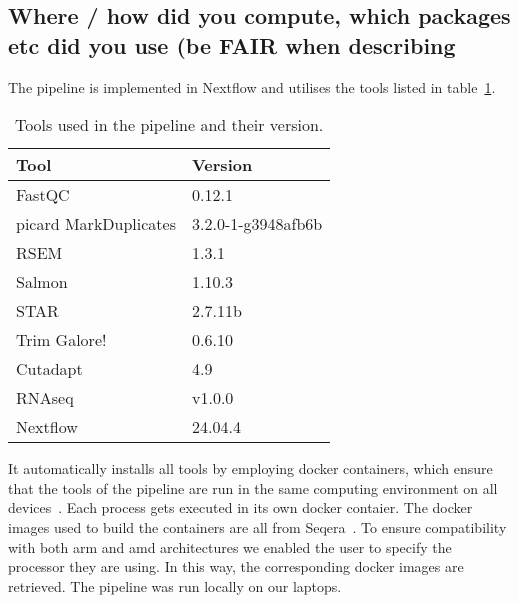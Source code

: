 \documentclass{article}
\theoremstyle{plain}
\theoremstyle{definition}
\theoremstyle{remark}
\begin{document}
\subsection{Where / how did you compute, which packages etc did you use (be FAIR when describing}
The pipeline is implemented in Nextflow and utilises the tools listed in table~\ref{table:1}.
\begin{table}[h]
    \centering
    \caption{Tools used in the pipeline and their version.}
    \label{table:1}
    \begin{tabular}{@{}lp{4cm}@{}}
        \toprule
        \textbf{Tool} & \textbf{Version} \\ \midrule
        FastQC & 0.12.1\\
        picard MarkDuplicates & 3.2.0-1-g3948afb6b\\
        RSEM & 1.3.1\\
        Salmon & 1.10.3\\
        STAR & 2.7.11b\\
        Trim Galore! & 0.6.10\\
        Cutadapt & 4.9\\
        RNAseq & v1.0.0\\
        Nextflow & 24.04.4\\
        \hline
    \end{tabular}
\end{table}
It automatically installs all tools by employing docker containers, which ensure that the tools of the pipeline are run in the same computing environment on all devices~\cite{docker}. Each process gets executed in its own docker contaier. The docker images used to build the containers are all from Seqera~\cite{seqera}. To ensure compatibility with both arm and amd architectures we enabled the user to specify the processor they are using. In this way, the corresponding docker images are retrieved.  
The pipeline was run locally on our laptops.
\end{document}
